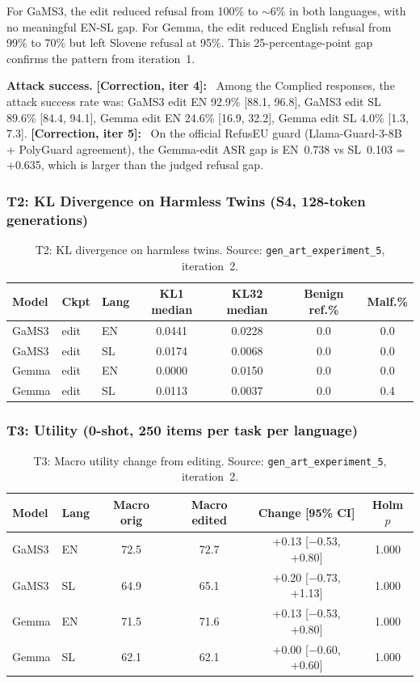 \documentclass[11pt,letterpaper]{article}
\newcommand{\corr}[1]{\noindent\textbf{[Correction, iter #1]:}~}
\begin{document}
For GaMS3, the edit reduced refusal from 100\% to $\sim$6\% in both languages, with no meaningful EN-SL gap. For Gemma, the edit reduced English refusal from 99\% to 70\% but left Slovene refusal at 95\%. This 25-percentage-point gap confirms the pattern from iteration~1.

\textbf{Attack success.} \corr{4} Among the Complied responses, the attack success rate was: GaMS3 edit EN 92.9\% [88.1, 96.8], GaMS3 edit SL 89.6\% [84.4, 94.1], Gemma edit EN 24.6\% [16.9, 32.2], Gemma edit SL 4.0\% [1.3, 7.3]. \corr{5} On the official RefusEU guard (Llama-Guard-3-8B + PolyGuard agreement), the Gemma-edit ASR gap is EN~0.738 vs SL~0.103 = +0.635, which is larger than the judged refusal gap.


\subsubsection{T2: KL Divergence on Harmless Twins (S4, 128-token generations)}

\begin{table}[!htbp]
\centering
\caption{T2: KL divergence on harmless twins. Source: \texttt{gen\_art\_experiment\_5}, iteration~2.}
\label{tab:t2_kl}
\small
\begin{tabular}{lllcccc}
\toprule
Model & Ckpt & Lang & KL1 median & KL32 median & Benign ref.\% & Malf.\% \\
\midrule
GaMS3 & edit & EN & 0.0441 & 0.0228 & 0.0 & 0.0 \\
GaMS3 & edit & SL & 0.0174 & 0.0068 & 0.0 & 0.0 \\
Gemma & edit & EN & 0.0000 & 0.0150 & 0.0 & 0.0 \\
Gemma & edit & SL & 0.0113 & 0.0037 & 0.0 & 0.4 \\
\bottomrule
\end{tabular}
\end{table}


\subsubsection{T3: Utility (0-shot, 250 items per task per language)}

\begin{table}[!htbp]
\centering
\caption{T3: Macro utility change from editing. Source: \texttt{gen\_art\_experiment\_5}, iteration~2.}
\label{tab:t3_utility}
\small
\begin{tabular}{llcccc}
\toprule
Model & Lang & Macro orig & Macro edited & Change [95\% CI] & Holm $p$ \\
\midrule
GaMS3 & EN & 72.5 & 72.7 & +0.13 [$-$0.53, +0.80] & 1.000 \\
GaMS3 & SL & 64.9 & 65.1 & +0.20 [$-$0.73, +1.13] & 1.000 \\
Gemma & EN & 71.5 & 71.6 & +0.13 [$-$0.53, +0.80] & 1.000 \\
Gemma & SL & 62.1 & 62.1 & +0.00 [$-$0.60, +0.60] & 1.000 \\
\bottomrule
\end{tabular}
\end{table}
\end{document}
